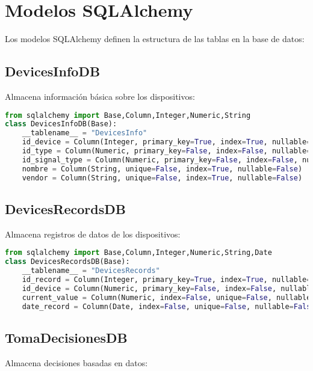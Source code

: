 \documentclass[12pt,letterpaper]{report}
\begin{document}
\section{Modelos SQLAlchemy}
Los modelos SQLAlchemy definen la estructura de las tablas en la base de datos:

\subsection{DevicesInfoDB}
Almacena información básica sobre los dispositivos:

\begin{lstlisting}[language=python]
    from sqlalchemy import Base,Column,Integer,Numeric,String
class DevicesInfoDB(Base):
    __tablename__ = "DevicesInfo"
    id_device = Column(Integer, primary_key=True, index=True, nullable=False, unique=True, autoincrement=True)
    id_type = Column(Numeric, primary_key=False, index=False, nullable=False, unique=True, autoincrement=False)
    id_signal_type = Column(Numeric, primary_key=False, index=False, nullable=False, unique=True, autoincrement=False)
    nombre = Column(String, unique=False, index=True, nullable=False)
    vendor = Column(String, unique=False, index=True, nullable=False)
\end{lstlisting}

\subsection{DevicesRecordsDB}
Almacena registros de datos de los dispositivos:

\begin{lstlisting}[language=python]
    from sqlalchemy import Base,Column,Integer,Numeric,String,Date
class DevicesRecordsDB(Base):
    __tablename__ = "DevicesRecords"
    id_record = Column(Integer, primary_key=True, index=True, nullable=False, unique=True, autoincrement=True)
    id_device = Column(Numeric, primary_key=False, index=False, nullable=False, unique=False, autoincrement=False)
    current_value = Column(Numeric, index=False, unique=False, nullable=False)
    date_record = Column(Date, index=False, unique=False, nullable=False)
\end{lstlisting}

\subsection{TomaDecisionesDB}
Almacena decisiones basadas en datos:
\end{document}
